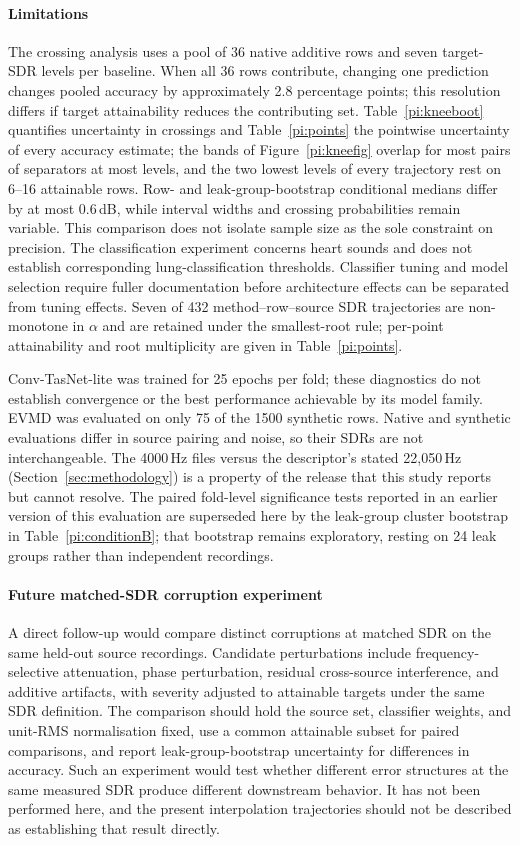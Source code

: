 \documentclass[journal]{IEEEtran}
\begin{document}
\paragraph{Limitations}
The crossing analysis uses a pool of 36 native additive rows and seven target-SDR levels per baseline. When all 36 rows contribute, changing one prediction changes pooled accuracy by approximately 2.8 percentage points; this resolution differs if target attainability reduces the contributing set. Table~\ref{pi:kneeboot} quantifies uncertainty in crossings and Table~\ref{pi:points} the pointwise uncertainty of every accuracy estimate; the bands of Figure~\ref{pi:kneefig} overlap for most pairs of separators at most levels, and the two lowest levels of every trajectory rest on 6--16 attainable rows. Row- and leak-group-bootstrap conditional medians differ by at most 0.6\,dB, while interval widths and crossing probabilities remain variable. This comparison does not isolate sample size as the sole constraint on precision. The classification experiment concerns heart sounds and does not establish corresponding lung-classification thresholds. Classifier tuning and model selection require fuller documentation before architecture effects can be separated from tuning effects. Seven of 432 method--row--source SDR trajectories are non-monotone in $\alpha$ and are retained under the smallest-root rule; per-point attainability and root multiplicity are given in Table~\ref{pi:points}.

Conv-TasNet-lite was trained for 25 epochs per fold; these diagnostics do not establish convergence or the best performance achievable by its model family. EVMD was evaluated on only 75 of the 1500 synthetic rows. Native and synthetic evaluations differ in source pairing and noise, so their SDRs are not interchangeable. The 4000\,Hz files versus the descriptor's stated 22{,}050\,Hz (Section~\ref{sec:methodology}) is a property of the release that this study reports but cannot resolve. The paired fold-level significance tests reported in an earlier version of this evaluation are superseded here by the leak-group cluster bootstrap in Table~\ref{pi:conditionB}; that bootstrap remains exploratory, resting on 24 leak groups rather than independent recordings.

\paragraph{Future matched-SDR corruption experiment}
A direct follow-up would compare distinct corruptions at matched SDR on the same held-out source recordings. Candidate perturbations include frequency-selective attenuation, phase perturbation, residual cross-source interference, and additive artifacts, with severity adjusted to attainable targets under the same SDR definition. The comparison should hold the source set, classifier weights, and unit-RMS normalisation fixed, use a common attainable subset for paired comparisons, and report leak-group-bootstrap uncertainty for differences in accuracy. Such an experiment would test whether different error structures at the same measured SDR produce different downstream behavior. It has not been performed here, and the present interpolation trajectories should not be described as establishing that result directly.
\end{document}
